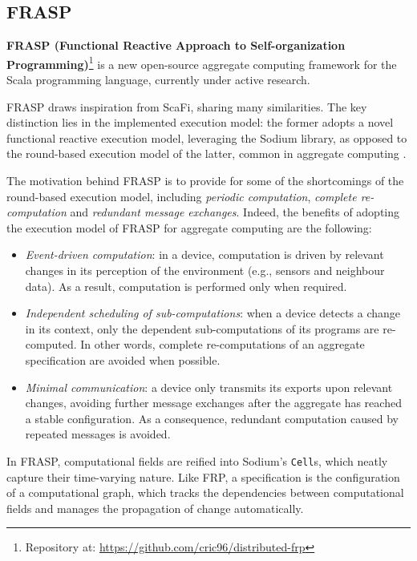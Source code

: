 
\subsection{FRASP}
\label{section:background:technologies:frasp}

\textbf{FRASP (Functional Reactive Approach to Self-organization Programming)}\footnote{Repository at: \url{https://github.com/cric96/distributed-frp}}
is a new open-source aggregate computing framework for the Scala programming
language, currently under active research.

FRASP draws inspiration from \ac{ScaFi}, sharing many similarities. The key
distinction lies in the implemented execution model: the former adopts a novel
functional reactive execution model, leveraging the Sodium library, as opposed
to the round-based execution model of the latter, common in aggregate computing
\cite{FRASP}.

The motivation behind FRASP is to provide for some of the shortcomings of the
round-based execution model, including \textit{periodic computation},
\textit{complete re-computation} and \textit{redundant message exchanges}.
Indeed, the benefits of adopting the execution model of FRASP for aggregate
computing are the following:
\begin{itemize}
  \item \textit{Event-driven computation}: in a device, computation is driven
        by relevant changes in its perception of the environment (e.g.,
        sensors and neighbour data). As a result, computation is performed
        only when required.
  \item \textit{Independent scheduling of sub-computations}: when a device
        detects a change in its context, only the dependent sub-computations
        of its programs are re-computed. In other words, complete
        re-computations of an aggregate specification are avoided when possible.
  \item \textit{Minimal communication}: a device only transmits its exports
        upon relevant changes, avoiding further message exchanges after the
        aggregate has reached a stable configuration. As a consequence, redundant
        computation caused by repeated messages is avoided.
\end{itemize}

In FRASP, computational fields are reified into Sodium's \texttt{Cell}s, which
neatly capture their time-varying nature. Like \ac{FRP}, a specification is the
configuration of a computational graph, which tracks the dependencies between
computational fields and manages the propagation of change automatically.

